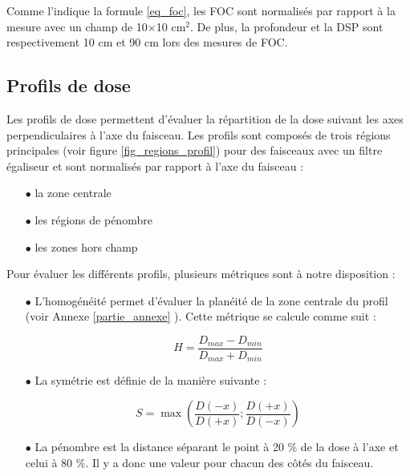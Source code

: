 \documentclass{book}
\begin{document}
Comme l'indique la formule \ref*{eq_foc}, les FOC sont normalisés par rapport à la mesure avec un champ de 10$\times$10 cm$^2$. De plus, la profondeur et la DSP sont respectivement 10 cm et 90 cm lors des mesures de FOC.

\subsection{Profils de dose}

Les profils de dose permettent d'évaluer la répartition de la dose suivant les axes perpendiculaires à l'axe du faisceau. Les profils sont composés de trois régions principales (voir figure \ref*{fig_regions_profil}) pour des faisceaux avec un filtre égaliseur et sont normalisés par rapport à l'axe du faisceau :

\begin{itemize}
  \item[$\bullet$] la zone centrale
  \item[$\bullet$] les régions de pénombre
  \item[$\bullet$] les zones hors champ
\end{itemize}

Pour évaluer les différents profils, plusieurs métriques sont à notre disposition :

\begin{itemize}
  \item[$\bullet$] L'homogénéité permet d'évaluer la planéité de la zone centrale du profil (voir Annexe \ref{partie_annexe} \cite{ansm2007}). Cette métrique se calcule comme suit :
  
  \begin{equation}
    H = \dfrac{D_{max} - D_{min}}{D_{max} + D_{min}}
    \label{eq_homogeneite}
  \end{equation}
  
  \item[$\bullet$] La symétrie est définie de la manière suivante :
  
  \begin{equation}
    S = \max\left(\dfrac{D(-x)}{D(+x)}; \dfrac{D(+x)}{D(-x)}\right)
    \label{eq_symetrie}
  \end{equation}
  
  \item[$\bullet$] La pénombre est la distance séparant le point à 20 \% de la dose à l'axe et celui à 80 \%. Il y a donc une valeur pour chacun des côtés du faisceau.  
\end{itemize}
\end{document}
